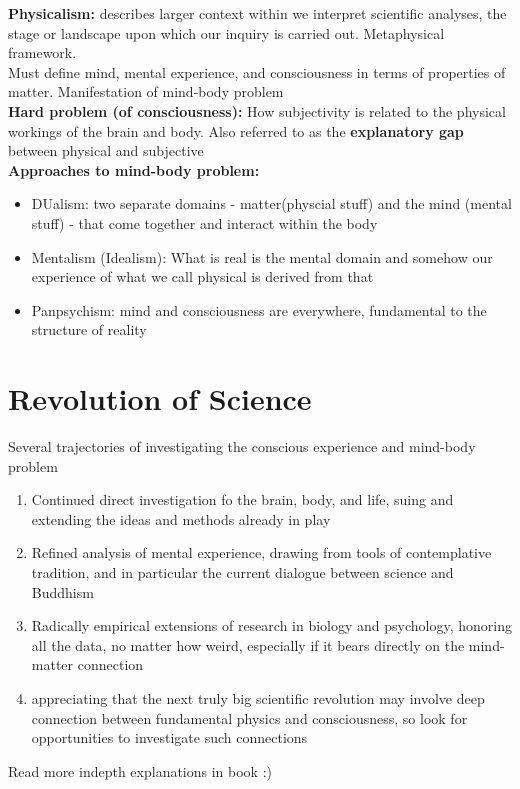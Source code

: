 \documentclass{article}
\begin{document}
\noindent \textbf{Physicalism:} describes larger context within we interpret scientific analyses, the stage or landscape upon which our inquiry is carried out. Metaphysical framework. \\

Must define mind, mental experience, and consciousness in terms of properties of matter. Manifestation of mind-body problem \\

\noindent \textbf{Hard problem (of consciousness):} How subjectivity is related to the physical workings of the brain and body. Also referred to as the \textbf{explanatory gap} between physical and subjective \\ 

\noindent \textbf{Approaches to mind-body problem:}
\begin{itemize}
    \item DUalism: two separate domains - matter(physcial stuff) and the mind (mental stuff) - that come together and interact within the body
    \item Mentalism (Idealism): What is real is the mental domain and somehow our experience of what we call physical is derived from that
    \item Panpsychism: mind and consciousness are everywhere, fundamental to the structure of reality
\end{itemize}

\section{Revolution of Science}
Several trajectories of investigating the conscious experience and mind-body problem
\begin{enumerate}
    \item Continued direct investigation fo the brain, body, and life, suing and extending the ideas and methods already in play
    \item Refined analysis of mental experience, drawing from tools of contemplative tradition, and in particular the current dialogue between science and Buddhism
    \item Radically empirical extensions of research in biology and psychology, honoring all the data, no matter how weird, especially if it bears directly on the mind-matter connection
    \item appreciating that the next truly big scientific revolution may involve deep connection between fundamental physics and consciousness, so look for opportunities to investigate such connections
\end{enumerate}

Read more indepth explanations in book :)
\end{document}
